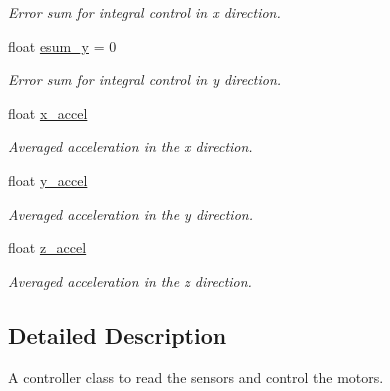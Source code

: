 \begin{DoxyCompactItemize}
\begin{DoxyCompactList}\small\item\em Error sum for integral control in x direction. \end{DoxyCompactList}\item 
float \hyperlink{classBalance_ab33dd36995e8099946a2ac783b43e0b8}{esum\+\_\+y} = 0\hypertarget{classBalance_ab33dd36995e8099946a2ac783b43e0b8}{}\label{classBalance_ab33dd36995e8099946a2ac783b43e0b8}

\begin{DoxyCompactList}\small\item\em Error sum for integral control in y direction. \end{DoxyCompactList}\item 
float \hyperlink{classBalance_abddf9398bdeb786166f36621c0a4d12e}{x\+\_\+accel}\hypertarget{classBalance_abddf9398bdeb786166f36621c0a4d12e}{}\label{classBalance_abddf9398bdeb786166f36621c0a4d12e}

\begin{DoxyCompactList}\small\item\em Averaged acceleration in the x direction. \end{DoxyCompactList}\item 
float \hyperlink{classBalance_a3407d85f72540873d148b186954b4c7a}{y\+\_\+accel}\hypertarget{classBalance_a3407d85f72540873d148b186954b4c7a}{}\label{classBalance_a3407d85f72540873d148b186954b4c7a}

\begin{DoxyCompactList}\small\item\em Averaged acceleration in the y direction. \end{DoxyCompactList}\item 
float \hyperlink{classBalance_a81e0ec6deb3f455643121fbb50e17070}{z\+\_\+accel}\hypertarget{classBalance_a81e0ec6deb3f455643121fbb50e17070}{}\label{classBalance_a81e0ec6deb3f455643121fbb50e17070}

\begin{DoxyCompactList}\small\item\em Averaged acceleration in the z direction. \end{DoxyCompactList}\end{DoxyCompactItemize}


\subsection{Detailed Description}
A controller class to read the sensors and control the motors. 

